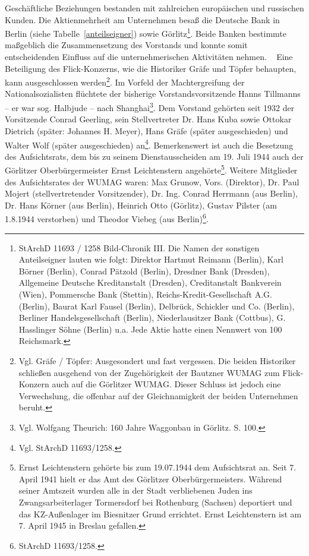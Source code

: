 \documentclass[a4paper,12pt,ngerman,
]{nisebook}
\begin{document}
Geschäftliche Beziehungen bestanden mit zahlreichen europäischen und russischen Kunden. Die Aktienmehrheit am Unternehmen besaß die Deutsche Bank in Berlin (siehe Tabelle~\ref{anteilseigner}) sowie Görlitz\footnote{StArchD 11693 / 1258 Bild-Chronik III. Die Namen der sonstigen Anteilseigner lauten wie folgt: Direktor Hartmut Reimann (Berlin), Karl Börner (Berlin), Conrad Pätzold (Berlin), Dresdner Bank (Dresden), Allgemeine Deutsche Kreditanstalt (Dresden), Creditanstalt Bankverein (Wien), Pommersche Bank (Stettin), Reichs-Kredit-Gesellschaft A.G. (Berlin), Baurat Karl Fausel (Berlin), Delbrück, Schickler und Co. (Berlin), Berliner Handelsgesellschaft (Berlin), Niederlausitzer Bank (Cottbus), G. Hasslinger Söhne (Berlin) u.a. Jede Aktie hatte einen Nennwert von 100 Reichsmark.}. Beide Banken bestimmte maßgeblich die Zusammensetzung des Vorstands und konnte somit entscheidenden Einfluss auf die unternehmerischen Aktivitäten nehmen.
~\newline
Eine Beteiligung des Flick-Konzerns, wie die Historiker Gräfe und Töpfer behaupten, kann ausgeschlossen werden\footnote{Vgl. Gräfe / Töpfer: Ausgesondert und fast vergessen. Die beiden Historiker schließen ausgehend von der Zugehörigkeit der Bautzner WUMAG zum Flick-Konzern auch auf die Görlitzer WUMAG. Dieser Schluss ist jedoch eine Verwechslung, die offenbar auf der Gleichnamigkeit der beiden Unternehmen beruht.}. Im Vorfeld der Machtergreifung der Nationalsozialisten flüchtete der bisherige Vorstandsvorsitzende Hanns Tillmanns -- er war sog. Halbjude -- nach Shanghai\footnote{Vgl. Wolfgang Theurich: 160 Jahre Waggonbau in Görlitz. S. 100.}. Dem Vorstand gehörten seit 1932 der Vorsitzende Conrad  Geerling, sein Stellvertreter Dr. Hans Kuba sowie Ottokar Dietrich (später: Johannes H. Meyer), Hans Gräfe (später ausgeschieden) und Walter Wolf (später ausgeschieden) an\footnote{Vgl. StArchD 11693/1258.}. Bemerkenswert ist auch die Besetzung des Aufsichtsrats, dem bis zu seinem Dienstausscheiden am 19. Juli 1944 auch der Görlitzer Oberbürgermeister Ernst Leichtenstern angehörte\footnote{Ernst Leichtenstern gehörte bis zum 19.07.1944 dem Aufsichtsrat an. Seit 7. April 1941 hielt er das Amt des Görlitzer Oberbürgermeisters. Während seiner Amtszeit wurden alle in der Stadt verbliebenen Juden ins Zwangsarbeiterlager Tormersdorf bei Rothenburg (Sachsen) deportiert und das KZ-Außenlager im Biesnitzer Grund errichtet. Ernst Leichtenstern ist am 7. April 1945 in Breslau gefallen.}. Weitere Mitglieder des Aufsichtsrates der WUMAG waren: Max Grunow, Vors. (Direktor), Dr. Paul Mojert (stellvertretender Vorsitzender), Dr. Ing. Conrad Herrmann (aus Berlin), Dr. Hans Körner (aus Berlin), Heinrich Otto (Görlitz), Gustav Pilster (am 1.8.1944 verstorben) und Theodor Viebeg (aus Berlin)\footnote{StArchD 11693/1258.}.
\end{document}
